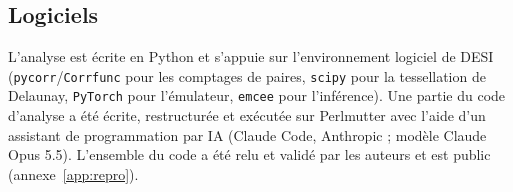 \subsection{Logiciels}
\label{sec:ai}

L'analyse est écrite en Python et s'appuie sur l'environnement logiciel de DESI (\texttt{pycorr}/\texttt{Corrfunc} pour les comptages de paires, \texttt{scipy} pour la tessellation de Delaunay, \texttt{PyTorch} pour l'émulateur, \texttt{emcee} pour l'inférence). Une partie du code d'analyse a été écrite, restructurée et exécutée sur Perlmutter avec l'aide d'un assistant de programmation par IA (Claude Code, Anthropic ; modèle Claude Opus 5.5). L'ensemble du code a été relu et validé par les auteurs et est public (annexe~\ref{app:repro}).
